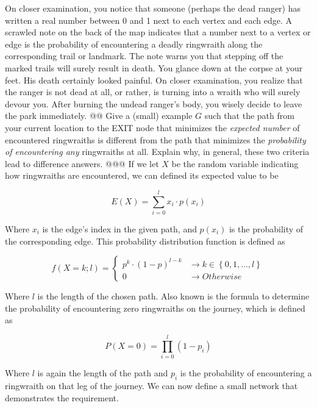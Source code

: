 \documentclass[10pt]{article}\usepackage[]{graphicx}\usepackage[]{xcolor}
\makeatletter
\newenvironment{kframe}{%
 \def\at@end@of@kframe{}%
 \ifinner\ifhmode%
  \def\at@end@of@kframe{\end{minipage}}%
  \begin{minipage}{\columnwidth}%
 \fi\fi%
 \def\FrameCommand##1{\hskip\@totalleftmargin \hskip-\fboxsep
 \colorbox{shadecolor}{##1}\hskip-\fboxsep
     \hskip-\linewidth \hskip-\@totalleftmargin \hskip\columnwidth}%
 \MakeFramed {\advance\hsize-\width
   \@totalleftmargin\z@ \linewidth\hsize
   \@setminipage}}%
 {\par\unskip\endMakeFramed%
 \at@end@of@kframe}
\newenvironment{knitrout}{}{} %
\makeatother
\begin{document}
\begin{easylist}[enumerate]
    On closer examination, you notice that someone (perhaps the dead ranger) has written a real number between 0 and 1
    next to each vertex and each edge. A scrawled note on the back of the map indicates that a number next to a vertex
    or edge is the probability of encountering a deadly ringwraith along the corresponding trail or landmark. The note
    warns you that stepping off the marked trails will surely result in death.  You glance down at the corpse at your
    feet. His death certainly looked painful. On closer examination, you realize that the ranger is not dead at all, or
    rather, is turning into a wraith who will surely devour you. After burning the undead ranger's body, you wisely
    decide to leave the park immediately.
    @@ Give a (small) example $G$ such that the path from your current location to the EXIT node that minimizes the
    \textit{expected number} of encountered ringwraiths is different from the path that minimizes the
    \textit{probability of encountering any} ringwraiths at all. Explain why, in general, these two criteria lead to
    difference answers.
    @@@ If we let $X$ be the random variable indicating how ringwraiths are encountered, we can defined its expected
    value to be

    \[
        E(X) = \sum_{i = 0}^l x_i \cdot p(x_i)
    \]

    Where $x_i$ is the edge's index in the given path, and $p(x_i)$ is the probability of the corresponding edge. This
    probability distribution function is defined as

    \[
        f(X = k; l) =
        \begin{cases}
            p^k \cdot (1 - p)^{l - k} &\to k \in \left\{ 0, 1, \ldots, l \right\}\\
            0 &\to Otherwise
        \end{cases}
    \]

    Where $l$ is the length of the chosen path. Also known is the formula to determine the probability of encountering
    zero ringwraiths on the journey, which is defined as

    \[
        P(X=0) = \prod^l_{i=0} (1 - p_i)
    \]

    Where $l$ is again the length of the path and $p_i$ is the probability of encountering a ringwraith on that leg of
    the journey. We can now define a small network that demonstrates the requirement.

\begin{knitrout}
\color{fgcolor}\begin{kframe}



\end{kframe}
\end{knitrout}
\end{easylist}
\end{document}
